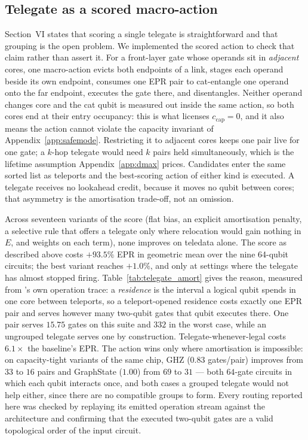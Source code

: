 \subsection{Telegate as a scored macro-action}
\label{app:telegate}
Section~VI states that scoring a single telegate is straightforward and
that grouping is the open problem.  We implemented the scored action to check
that claim rather than assert it.  For a front-layer gate whose operands sit in
\emph{adjacent} cores, one macro-action evicts both endpoints of a link, stages
each operand beside its own endpoint, consumes one EPR pair to cat-entangle one
operand onto the far endpoint, executes the gate there, and disentangles.
Neither operand changes core and the cat qubit is measured out inside the same
action, so both cores end at their entry occupancy: this is what licenses
$c_{\mathrm{cap}}=0$, and it also means the action cannot violate the capacity
invariant of Appendix~\ref{app:safemode}.  Restricting it to adjacent cores
keeps one pair live for one gate; a $k$-hop telegate would need $k$ pairs held
simultaneously, which is the lifetime assumption
Appendix~\ref{app:dmax} prices.  Candidates enter the same sorted list as
teleports and the best-scoring action of either kind is executed.  A telegate
receives no lookahead credit, because it moves no qubit between cores; that
asymmetry is the amortisation trade-off, not an omission.

Across seventeen variants of the score (flat bias, an explicit
amortisation penalty, a selective rule that offers a telegate only where
relocation would gain nothing in $E$, and weights on each term), none improves
on teledata alone.  The score as described above costs $+93.5\%$ EPR in
geometric mean over the nine 64-qubit circuits; the best variant reaches
$+1.0\%$, and only at settings where the telegate has almost stopped firing.
Table~\ref{tab:telegate_amort} gives the reason, measured from \dSABRE{}'s own
operation trace: a \emph{residence} is the interval a logical qubit spends in
one core between teleports, so a teleport-opened residence costs exactly one
EPR pair and serves however many two-qubit gates that qubit executes there.
One pair serves $15.75$ gates on this suite and $332$ in the worst case, while
an ungrouped telegate serves one by construction.  Telegate-whenever-legal
costs $6.1\times$ the baseline's EPR.  The action wins only where amortisation
is impossible: on capacity-tight variants of the same chip, GHZ ($0.83$
gates/pair) improves from $33$ to $16$ pairs and GraphState ($1.00$) from $69$
to $31$ --- both $64$-gate circuits in which each qubit interacts once, and
both cases a grouped telegate would not help either, since there are no
compatible groups to form.  Every routing reported here was checked by
replaying its emitted operation stream against the architecture and confirming
that the executed two-qubit gates are a valid topological order of the input
circuit.

